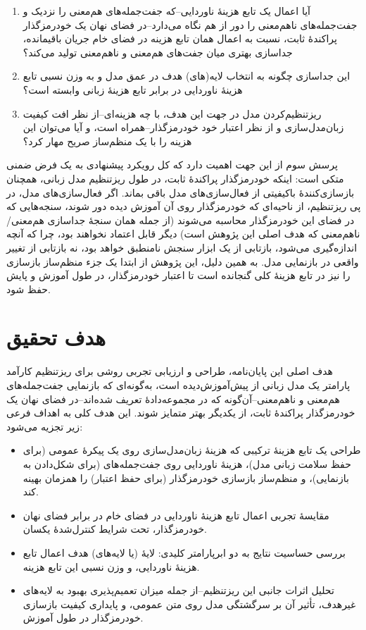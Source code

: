 \begin{enumerate}
\item آیا اعمال یک تابع هزینهٔ ناوردایی--که جفت‌جمله‌های هم‌معنی
را نزدیک و جفت‌جمله‌های ناهم‌معنی را دور از هم نگاه می‌دارد--در فضای نهان یک خودرمزگذار پراکندهٔ ثابت، نسبت به اعمال همان تابع هزینه در فضای خام جریان باقیمانده، جداسازی بهتری میان جفت‌های هم‌معنی و ناهم‌معنی تولید می‌کند؟
\item این جداسازی چگونه به انتخاب لایه(های) هدف در عمق مدل و به وزن نسبی تابع هزینهٔ ناوردایی در برابر تابع هزینهٔ زبانی وابسته است؟
\item ریزتنظیم‌کردن مدل در جهت این هدف، با چه هزینه‌ای--از نظر افت کیفیت زبان‌مدل‌سازی و از نظر اعتبار خود خودرمزگذار--همراه است، و آیا می‌توان این هزینه را با یک منظم‌ساز صریح مهار کرد؟
\end{enumerate}

پرسش سوم از این جهت اهمیت دارد که کل رویکرد پیشنهادی به یک فرض ضمنی متکی است: اینکه خودرمزگذار پراکندهٔ ثابت، در طول ریزتنظیم مدل زبانی، همچنان بازسازی‌کنندهٔ باکیفیتی از فعال‌سازی‌های مدل باقی بماند. اگر فعال‌سازی‌های مدل، در پی ریزتنظیم، از ناحیه‌ای که خودرمزگذار روی آن آموزش دیده دور شوند، سنجه‌هایی که در فضای این خودرمزگذار محاسبه می‌شوند (از جمله همان سنجهٔ جداسازی هم‌معنی/ناهم‌معنی که هدف اصلی این پژوهش است) دیگر قابل اعتماد نخواهند بود، چرا که آنچه اندازه‌گیری می‌شود، بازتابی از یک ابزار سنجش نامنطبق خواهد بود، نه بازتابی از تغییر واقعی در بازنمایی مدل. به همین دلیل، این پژوهش از ابتدا یک جزء منظم‌ساز بازسازی
را نیز در تابع هزینهٔ کلی گنجانده است تا اعتبار خودرمزگذار، در طول آموزش و پایش حفظ شود.

\section{هدف تحقیق}
هدف اصلی این پایان‌نامه، طراحی و ارزیابی تجربی روشی برای ریزتنظیم کارآمد پارامتر
یک مدل زبانی از پیش‌آموزش‌دیده است، به‌گونه‌ای که بازنمایی جفت‌جمله‌های هم‌معنی و ناهم‌معنی--آن‌گونه که در مجموعه‌دادهٔ
تعریف شده‌اند--در فضای نهان یک خودرمزگذار پراکندهٔ ثابت، از یکدیگر بهتر متمایز شوند. این هدف کلی به اهداف فرعی زیر تجزیه می‌شود:

\begin{itemize}
\item طراحی یک تابع هزینهٔ ترکیبی که هزینهٔ زبان‌مدل‌سازی روی یک پیکرهٔ عمومی (برای حفظ سلامت زبانی مدل)، هزینهٔ ناوردایی روی جفت‌جمله‌های
(برای شکل‌دادن به بازنمایی)، و منظم‌ساز بازسازی خودرمزگذار (برای حفظ اعتبار) را همزمان بهینه کند.
\item مقایسهٔ تجربی اعمال تابع هزینهٔ ناوردایی در فضای خام در برابر فضای نهان خودرمزگذار، تحت شرایط کنترل‌شدهٔ یکسان.
\item بررسی حساسیت نتایج به دو ابرپارامتر کلیدی: لایهٔ (یا لایه‌های) هدف اعمال تابع هزینهٔ ناوردایی، و وزن نسبی این تابع هزینه.
\item تحلیل اثرات جانبی این ریزتنظیم--از جمله میزان تعمیم‌پذیری بهبود به لایه‌های غیرهدف، تأثیر آن بر سرگشتگی
مدل روی متن عمومی، و پایداری کیفیت بازسازی خودرمزگذار در طول آموزش.
\end{itemize}

